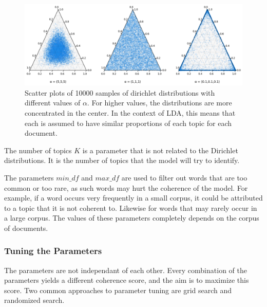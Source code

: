 \begin{figure}[h]
    \centering
    \includegraphics[width=1\textwidth]{resources/dirichlet_example.png}
    \caption{Scatter plots of 10000 samples of dirichlet distributions with different values of $\alpha$. For higher values, the distributions are more concentrated in the center. In the context of LDA, this means that each is assumed to have similar proportions of each topic for each document.}
    \label{fig:spelling_error_distribution}
\end{figure}


The number of topics $K$ is a parameter that is not related to the Dirichlet distributions. It is the number of topics that the model will try to identify.

The parameters $min\_df$ and $max\_df$ are used to filter out words that are too common or too rare, as such words may hurt the coherence of the model. For example, if a word occurs very frequently in a small corpus, it could be attributed to a topic that it is not coherent to. Likewise for words that may rarely occur in a large corpus. The values of these parameters completely depends on the corpus of documents.

\subsubsection*{Tuning the Parameters}

The parameters are not independant of each other. Every combination of the parameters yields a different coherence score, and the aim is to maximize this score. Two common approaches to parameter tuning are grid search and randomized search. 


